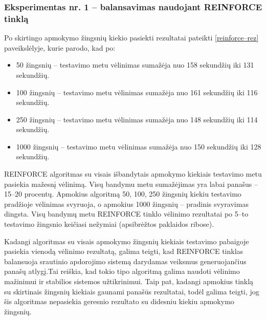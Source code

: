 \documentclass{VUMIFPSbakalaurinis}
\begin{document}
\subsubsection{Eksperimentas nr. 1 – balansavimas naudojant REINFORCE tinklą}
Po skirtingo apmokymo žingsnių kiekio pasiekti rezultatai pateikti \ref{reinforce–rez} paveikslėlyje, kurie parodo, kad po:
\begin{itemize}
    \item 50 žingsnių – testavimo metu vėlinimas sumažėja nuo 158 sekundžių iki 131 sekundžių. 
    \item 100 žingsnių – testavimo metu vėlinimas sumažėja nuo 161 sekundžių iki 116 sekundžių.
    \item 250 žingsnių – testavimo metu vėlinimas sumažėja nuo 148 sekundžių iki 114 sekundžių.
    \item 1000 žingsnių – testavimo metu vėlinimas sumažėja nuo 150 sekundžių iki 128 sekundžių.
\end{itemize}
REINFORCE algoritmas su visais išbandytais apmokymo kiekiais testavimo metu pasiekia mažesnį vėlinimą. Visų bandymu metu sumažėjimas yra labai panašus – 15–20 procentų.
Apmokius algoritmą 50, 100, 250 žingsnių kiekiu testavimo pradžioje vėlinimas svyruoja, o apmokius 1000 žingsnių – pradinis svyravimas dingsta. Visų bandymų metu REINFORCE tinklo vėlinimo rezultatai po 5–to testavimo žingsnio keičiasi nežymiai (apsibrėžtos paklaidos ribose).

Kadangi algoritmas su visais apmokymo žingsnių kiekiais testavimo pabaigoje pasiekia vienodą vėlinimo rezultatą, galima teigti, kad REINFORCE tinklas balansuoja srautinio apdorojimo sistemą darydamas veiksmus generuojančius panašų atlygį.Tai reiškia, kad tokio tipo algoritmą galima naudoti vėlinimo mažinimui ir stabilios sistemos užtikrinimui. Taip pat, kadangi apmokius tinklą su skirtinais žingsnių kiekiais gaunami panašūs rezultatai, todėl galima teigti, jog šis algoritmas nepasiekia geresnio rezultato su didesniu kiekiu apmokymo žingsnių.
\end{document}
